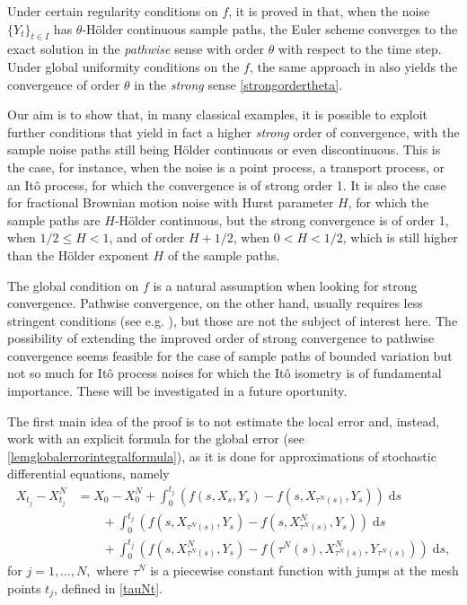 \documentclass[reqno,12pt]{amsart}
\theoremstyle{plain} %
\theoremstyle{definition} %
\begin{document}
Under certain regularity conditions on $f$, it is proved in \cite{GruneKloeden2001} that, when the noise $\{Y_t\}_{t\in I}$ has $\theta$-H\"older continuous sample paths, the Euler scheme converges to the exact solution in the \emph{pathwise} sense with order $\theta$ with respect to the time step. Under global uniformity conditions on the $f$, the same approach in \cite{GruneKloeden2001} also yields the convergence of order $\theta$ in the \emph{strong} sense \eqref{strongordertheta}.

Our aim is to show that, in many classical examples, it is possible to exploit further conditions that yield in fact a higher \emph{strong} order of convergence, with the sample noise paths still being H\"older continuous or even discontinuous. This is the case, for instance, when the noise is a point process, a transport process, or an It\^o process, for which the convergence is of strong order 1. It is also the case for fractional Brownian motion noise with Hurst parameter $H$, for which the sample paths are $H$-H\"older continuous, but the strong convergence is of order 1, when $1/2 \leq H < 1$, and of order $H + 1/2$, when $0 < H < 1/2$, which is still higher than the H\"older exponent $H$ of the sample paths.

The global condition on $f$ is a natural assumption when looking for strong convergence. Pathwise convergence, on the other hand, usually requires less stringent conditions (see e.g. \cite{JentzenKloedenNeuenkirch2009, JentzenKloeden2011}), but those are not the subject of interest here. The possibility of extending the improved order of strong convergence to pathwise convergence seems feasible for the case of sample paths of bounded variation but not so much for It\^o process noises for which the It\^o isometry is of fundamental importance. These will be investigated in a future oportunity.

The first main idea of the proof is to not estimate the local error and, instead, work with an explicit formula for the global error (see \cref{lemglobalerrorintegralformula}), as it is done for approximations of stochastic differential equations, namely
\begin{equation}
    \label{lemglobalerrorintegralformulaintro}
    \begin{aligned}
        X_{t_j} - X_{t_j}^N & = X_0 - X_0^N + \int_0^{t_j} \left( f(s, X_s, Y_s) - f(s, X_{\tau^N(s)}, Y_s) \right)\;\mathrm{d}s  \\ 
        & \qquad + \int_{0}^{t_j} \left( f(s, X_{\tau^N(s)}, Y_s) - f(s, X_{\tau^N(s)}^N, Y_s) \right)\;\mathrm{d}s \\
        & \qquad + \int_0^{t_j} \left( f(s, X_{\tau^N(s)}^N, Y_s) - f(\tau^N(s), X_{\tau^N(s)}^N, Y_{\tau^N(s)}) \right)\;\mathrm{d}s,
    \end{aligned}
\end{equation}
for $j = 1, \ldots, N,$ where $\tau^N$ is a piecewise constant function with jumps at the mesh points $t_j$, defined in \eqref{tauNt}.
\end{document}

